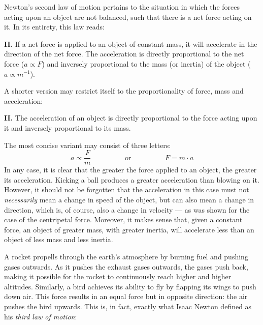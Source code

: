 
Newton's second law of motion pertains to the situation in which the forces acting upon an object are not balanced, such that there is a net force acting on it. In its entirety, this law reads:

\begin{displayquote}
	\textbf{II.} If a net force is applied to an object of constant mass, it will accelerate in the direction of the net force. The acceleration is directly proportional to the net force ($a \propto F$) and inversely proportional to the mass (or inertia) of the object ($a \propto m^{-1}$).
\end{displayquote}

A shorter version may restrict itself to the proportionality of force, mass and acceleration:

\begin{displayquote}
	\textbf{II.} The acceleration of an object is directly proportional to the force acting upon it and inversely proportional to its mass.
\end{displayquote}

The most concise variant may consist of three letters: $$a \propto \frac{F}{m} \hspace{2cm} \text{or} \hspace{2cm} F = m \cdot a$$ In any case, it is clear that the greater the force applied to an object, the greater its acceleration. Kicking a ball produces a greater acceleration than blowing on it. However, it should not be forgotten that the acceleration in this case must not \emph{necessarily} mean a change in speed of the object, but can also mean a change in direction, which is, of course, also a change in velocity --- as was shown for the case of the centripetal force. Moreover, it makes sense that, given a constant force, an object of greater mass, with greater inertia, will accelerate less than an object of less mass and less inertia.


A rocket propells through the earth's atmosphere by burning fuel and pushing gases outwards. As it pushes the exhaust gases outwards, the gases push back, making it possible for the rocket to continuously reach higher and higher altitudes. Similarly, a bird achieves its ability to fly by flapping its wings to push down air. This force results in an equal force but in opposite direction: the air pushes the bird upwards. This is, in fact, exactly what Isaac Newton defined as his \emph{third law of motion}:


